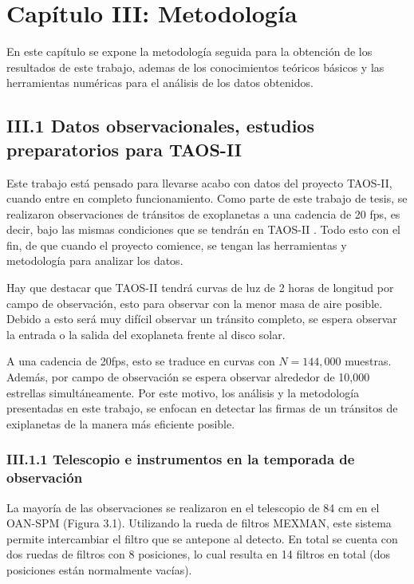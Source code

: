 \chapter*{\textbf{Capítulo III: Metodología}}
\setcounter{chapter}{3}

En este capítulo se expone la metodología seguida para la obtención de los resultados de este trabajo, ademas de los conocimientos teóricos básicos y las herramientas numéricas para el análisis de los datos obtenidos.


\section*{III.1 Datos observacionales, estudios preparatorios para TAOS-II}

Este trabajo está pensado para llevarse acabo con datos del proyecto TAOS-II, cuando entre en completo funcionamiento. Como parte de este trabajo de tesis, se realizaron observaciones de tránsitos de exoplanetas a una cadencia de 20 fps, es decir, bajo las mismas condiciones que se tendrán en TAOS-II \cite{lehner2012transneptunian}. Todo esto con el fin, de que cuando el proyecto comience, se tengan las herramientas y metodología para analizar los datos.

Hay que destacar que TAOS-II tendrá curvas de luz de 2 horas de longitud por campo de observación, esto para observar con la menor masa de aire posible. Debido a esto será muy difícil observar un tránsito completo, se espera observar la entrada o la salida del exoplaneta frente al disco solar. 

A una cadencia de 20fps, esto se traduce en curvas con $N=144,000$ muestras. Además, por campo de observación se espera observar alrededor de 10,000 estrellas simultáneamente. Por este motivo, los análisis y la metodología presentadas en este trabajo, se enfocan en detectar las firmas de un tránsitos de exiplanetas de la manera más eficiente posible.

\subsection*{III.1.1 Telescopio e instrumentos en la temporada de observación}

La mayoría de las observaciones se realizaron en el telescopio de 84 cm en el OAN-SPM (Figura 3.1). Utilizando la rueda de filtros MEXMAN, este sistema permite intercambiar el filtro que se antepone al detecto. En total se cuenta con dos ruedas de filtros con 8 posiciones, lo cual resulta en 14 filtros en total (dos posiciones están normalmente vacías). 

